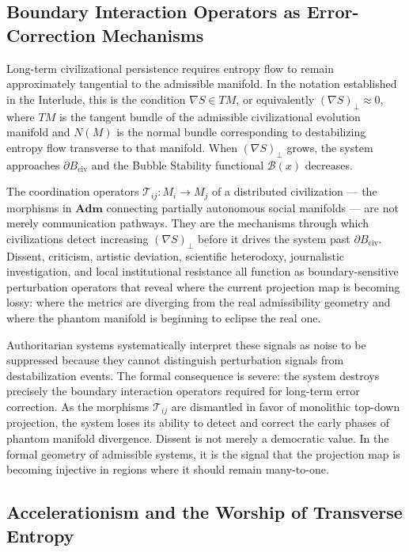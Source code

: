 \documentclass[12pt, a4paper]{article}
\theoremstyle{essaystyle}
\begin{document}
\subsection{Boundary Interaction Operators as Error-Correction Mechanisms}

Long-term civilizational persistence requires entropy flow to remain approximately
tangential to the admissible manifold. In the notation established in the Interlude,
this is the condition $\nabla S \in TM$, or equivalently $(\nabla S)_\perp \approx 0$,
where $TM$ is the tangent bundle of the admissible civilizational evolution manifold
and $N(M)$ is the normal bundle corresponding to destabilizing entropy flow transverse
to that manifold. When $(\nabla S)_\perp$ grows, the system approaches $\partial B_{\mathrm{civ}}$
and the Bubble Stability functional $\mathcal{B}(x)$ decreases.

The coordination operators $\mathcal{T}_{ij} : M_i \to M_j$ of a distributed
civilization --- the morphisms in $\mathbf{Adm}$ connecting partially autonomous
social manifolds --- are not merely communication pathways. They are the mechanisms
through which civilizations detect increasing $(\nabla S)_\perp$ before it drives
the system past $\partial B_{\mathrm{civ}}$. Dissent, criticism, artistic deviation,
scientific heterodoxy, journalistic investigation, and local institutional resistance
all function as boundary-sensitive perturbation operators that reveal where the
current projection map is becoming lossy: where the metrics are diverging from the
real admissibility geometry and where the phantom manifold is beginning to eclipse
the real one.

Authoritarian systems systematically interpret these signals as noise to be suppressed
because they cannot distinguish perturbation signals from destabilization events. The
formal consequence is severe: the system destroys precisely the boundary interaction
operators required for long-term error correction. As the morphisms $\mathcal{T}_{ij}$
are dismantled in favor of monolithic top-down projection, the system loses its
ability to detect and correct the early phases of phantom manifold divergence.
Dissent is not merely a democratic value. In the formal geometry of admissible systems,
it is the signal that the projection map is becoming injective in regions where it
should remain many-to-one.

\subsection{Accelerationism and the Worship of Transverse Entropy}
\end{document}
